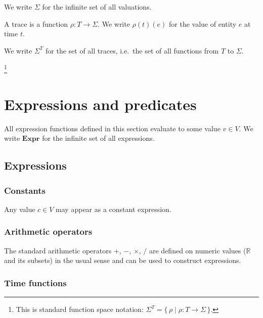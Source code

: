 We write $\Sigma$ for the infinite set of all valuations.

\begin{definition}[Trace]\label{def:trace}
    A trace is a function $\rho : T \to \Sigma$. We write $\rho(t)(e)$ for the value of entity $e$ at time $t$.
\end{definition}

We write $\Sigma^T$ for the set of all traces, i.e.\ the set of all functions from $T$ to $\Sigma$.

\footnote{This is standard function space notation: $\Sigma^T = \{\, \rho \mid \rho : T \to \Sigma \,\}$.}

\section{Expressions and predicates}

All expression functions defined in this section evaluate to some value $v \in V$.
We write $\mathbf{Expr}$ for the infinite set of all expressions.
\subsection{Expressions}\label{subsec:expressions}

\subsubsection{Constants}\label{subsec:constants}

\begin{definition}[Constant]\label{def:constant}
    Any value $c \in V$ may appear as a constant expression.
\end{definition}

\subsubsection{Arithmetic operators}\label{subsec:arithmetic}

\begin{definition}\label{def:arithmetic}
    The standard arithmetic operators $+$, $-$, $\times$, $/$ are defined on numeric values ($\mathbb{R}$ and its subsets) in the usual sense and can be used to construct expressions.
\end{definition}

\subsubsection{Time functions}\label{subsec:time}

